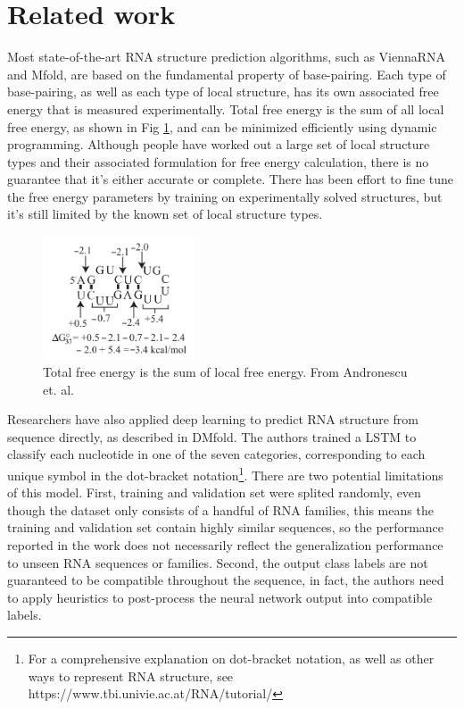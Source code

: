 \documentclass{proposal}
\begin{document}


\section{Related work}

Most state-of-the-art RNA structure prediction algorithms, such as ViennaRNA\cite{lorenz2011viennarna} and Mfold\cite{zuker2003mfold},
are based on the fundamental property of base-pairing.
Each type of base-pairing, as well as each type of local structure, has its own associated free energy that is measured experimentally.
Total free energy is the sum of all local free energy, as shown in Fig \ref{fig:free_energy_dp}, and can be minimized efficiently using dynamic programming.
Although people have worked out a large set of local structure types and their associated formulation for free energy calculation,
there is no guarantee that it's either accurate or complete.
There has been effort to fine tune the free energy parameters by training on experimentally solved structures\cite{andronescu2007efficient},
but it's still limited by the known set of local structure types.

\begin{figure}[h!]
    \centering
    \includegraphics[width=0.4\textwidth]{free_energy_dp.png}
    \caption{Total free energy is the sum of local free energy. From Andronescu et. al\cite{andronescu2007efficient}.}
    \label{fig:free_energy_dp}
    \centering
\end{figure}



Researchers have also applied deep learning to predict RNA structure from sequence directly, as described in DMfold\cite{wang2019dmfold}.
The authors trained a LSTM to classify each nucleotide in one of the seven categories,
corresponding to each unique symbol in the dot-bracket notation\footnote{For a comprehensive explanation on dot-bracket notation, as well as other ways to represent RNA structure, see https://www.tbi.univie.ac.at/RNA/tutorial/}.
There are two potential limitations of this model.
First, training and validation set were splited randomly, even though the dataset only consists of a handful of RNA families,
this means the training and validation set contain highly similar sequences,
so the performance reported in the work does not necessarily reflect the generalization performance to unseen RNA sequences or families.
Second, the output class labels are not guaranteed to be compatible throughout the sequence, in fact,
the authors need to apply heuristics to post-process the neural network output into compatible labels.
\end{document}
